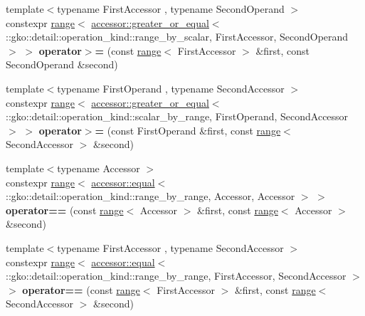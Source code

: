 \begin{DoxyCompactItemize}
\item 
\mbox{\label{namespacegko_a21e68118a9f8c4eb4c5c5d93a9a98e84}} 
{\footnotesize template$<$typename First\+Accessor , typename Second\+Operand $>$ }\\constexpr \hyperlink{classgko_1_1range}{range}$<$ \hyperlink{structgko_1_1accessor_1_1greater__or__equal}{accessor\+::greater\+\_\+or\+\_\+equal}$<$ \+::gko\+::detail\+::operation\+\_\+kind\+::range\+\_\+by\+\_\+scalar, First\+Accessor, Second\+Operand $>$ $>$ {\bfseries operator$>$=} (const \hyperlink{classgko_1_1range}{range}$<$ First\+Accessor $>$ \&first, const Second\+Operand \&second)
\item 
\mbox{\label{namespacegko_a60e5c84356708a0ee714198c211118d7}} 
{\footnotesize template$<$typename First\+Operand , typename Second\+Accessor $>$ }\\constexpr \hyperlink{classgko_1_1range}{range}$<$ \hyperlink{structgko_1_1accessor_1_1greater__or__equal}{accessor\+::greater\+\_\+or\+\_\+equal}$<$ \+::gko\+::detail\+::operation\+\_\+kind\+::scalar\+\_\+by\+\_\+range, First\+Operand, Second\+Accessor $>$ $>$ {\bfseries operator$>$=} (const First\+Operand \&first, const \hyperlink{classgko_1_1range}{range}$<$ Second\+Accessor $>$ \&second)
\item 
\mbox{\label{namespacegko_a9b12398fc180e82bf31cd7aa210ba731}} 
{\footnotesize template$<$typename Accessor $>$ }\\constexpr \hyperlink{classgko_1_1range}{range}$<$ \hyperlink{structgko_1_1accessor_1_1equal}{accessor\+::equal}$<$ \+::gko\+::detail\+::operation\+\_\+kind\+::range\+\_\+by\+\_\+range, Accessor, Accessor $>$ $>$ {\bfseries operator==} (const \hyperlink{classgko_1_1range}{range}$<$ Accessor $>$ \&first, const \hyperlink{classgko_1_1range}{range}$<$ Accessor $>$ \&second)
\item 
\mbox{\label{namespacegko_a754f3a148a6ffbd2ebc1de4950f874d3}} 
{\footnotesize template$<$typename First\+Accessor , typename Second\+Accessor $>$ }\\constexpr \hyperlink{classgko_1_1range}{range}$<$ \hyperlink{structgko_1_1accessor_1_1equal}{accessor\+::equal}$<$ \+::gko\+::detail\+::operation\+\_\+kind\+::range\+\_\+by\+\_\+range, First\+Accessor, Second\+Accessor $>$ $>$ {\bfseries operator==} (const \hyperlink{classgko_1_1range}{range}$<$ First\+Accessor $>$ \&first, const \hyperlink{classgko_1_1range}{range}$<$ Second\+Accessor $>$ \&second)

\end{DoxyCompactItemize}
